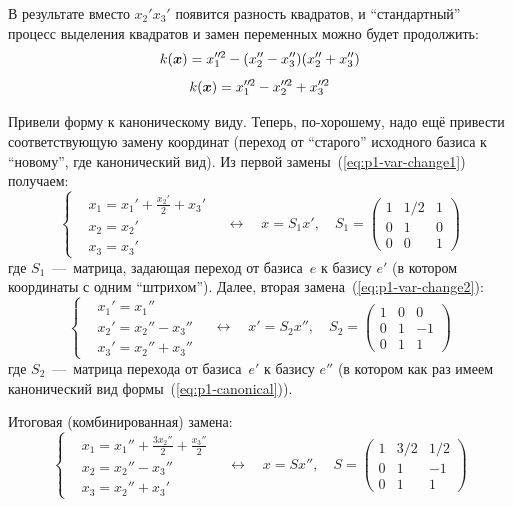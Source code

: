 \documentclass[a4paper,12pt]{article}
\newcommand*{\dprime}{{\prime\prime}\mkern-1.2mu}
\begin{document}
\begin{solution}
    В результате вместо $x_2' x_3'$ появится разность квадратов, и ``стандартный'' процесс выделения квадратов и замен переменных можно будет продолжить:
    \[
      k(\bds x) = x_1^{\dprime 2} - (x_2'' - x_3'') (x_2'' + x_3'')
    \]
    \begin{equation}\label{eq:p1-canonical}
      k(\bds x) = x_1^{\dprime 2} - x_2^{\dprime 2} + x_3^{\dprime 2}
    \end{equation}
    
    Привели форму к каноническому виду.
    Теперь, по-хорошему, надо ещё привести соответствующую замену координат (переход от ``старого'' исходного базиса к ``новому'', где канонический вид).
    Из первой замены~(\ref{eq:p1-var-change1}) получаем:
    \[
      \left\{
        \begin{aligned}
          &x_1 = x_1' + \frac{x_2'}{2} + x_3'\\
          &x_2 = x_2'\\
          &x_3 = x_3'
        \end{aligned}
      \right. \quad\leftrightarrow\quad x = S_1 x',\quad S_1 = \begin{pmatrix}
        1 & 1/2 & 1\\
        0 & 1 & 0\\
        0 & 0 & 1
      \end{pmatrix}
    \]
    где $S_1$~---~матрица, задающая переход от базиса~$e$ к базису $e'$ (в котором координаты с одним ``штрихом'').
    Далее, вторая замена~(\ref{eq:p1-var-change2}):
    \[
      \left\{
        \begin{aligned}
          &x_1' = x_1''\\
          &x_2' = x_2'' - x_3''\\
          &x_3' = x_2'' + x_3''
        \end{aligned}
      \right. \quad\leftrightarrow\quad x' = S_2 x'',\quad S_2 = \begin{pmatrix}
        1 & 0 & 0\\
        0 & 1 & -1\\
        0 & 1 & 1
      \end{pmatrix}
    \]
    где $S_2$~---~матрица перехода от базиса~$e'$ к базису $e''$ (в котором как раз имеем канонический вид формы~(\ref{eq:p1-canonical})).
    
    Итоговая (комбинированная) замена:
    \[
      \left\{
        \begin{aligned}
          &x_1 = x_1'' + \frac{3 x_2''}{2} + \frac{x_3''}{2}\\
          &x_2 = x_2'' - x_3''\\
          &x_3 = x_2'' + x_3'
        \end{aligned}
      \right. \quad\leftrightarrow\quad x = S x'',\quad S = \begin{pmatrix}
        1 & 3/2 & 1/2\\
        0 & 1 & -1\\
        0 & 1 & 1
      \end{pmatrix}
    \]
    

\end{solution}
\end{document}
